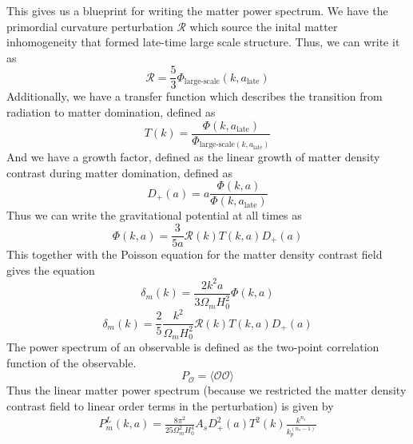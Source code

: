 This gives us a blueprint for writing the matter power spectrum. We have the primordial curvature perturbation $\mathcal{R}$ which source the inital matter inhomogeneity that formed late-time large scale structure. Thus, we can write it as
\begin{equation}
	\mathcal{R} = \frac{5}{3}\Phi_{\text{large-scale}}(k,a_{\text{late}})
\end{equation} 
Additionally, we have a transfer function which describes the transition from radiation to matter domination, defined as
\begin{equation}
	T(k) = \frac{\Phi(k,a_{\text{late}})}{\Phi_{\text{large-scale}(k,a_{\text{late}})}}
\end{equation}
And we have a growth factor, defined as the linear growth of matter density contrast during matter domination, defined as
\begin{equation}
	D_+(a) = a \frac{\Phi(k,a)}{\Phi(k,a_{\text{late}})}
\end{equation}
Thus we can write the gravitational potential at all times as
\begin{equation}
	\Phi(k,a) = \frac{3}{5a}\mathcal{R}(k)T(k,a)D_+(a)
\end{equation}
This together with the Poisson equation for the matter density contrast field gives the equation
\begin{equation}
	\delta_m(k) = \frac{2k^2a}{3\Omega_mH_0^2}\Phi(k,a)
\end{equation}
\begin{equation}
	\delta_m(k) = \frac{2}{5}\frac{k^2}{\Omega_mH_0^2}\mathcal{R}(k)T(k,a)D_+(a)
\end{equation}
The power spectrum of an observable is defined as the two-point correlation function of the observable.
\begin{equation}
	P_\mathcal{O} = \langle \mathcal{O}\mathcal{O} \rangle
\end{equation}
Thus the linear matter power spectrum (because we restricted the matter density contrast field to linear order terms in the perturbation) is given by
\begin{equation}
	\begin{split}
		P_m^{L}(k,a) = \frac{8\pi^2}{25 \Omega_m^2 H_0^4} A_s D_+^2(a)T^2(k)\frac{k^{n_s}}{k_p^{(n_s-1)}}
	\end{split}
\end{equation}

